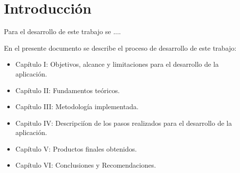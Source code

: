 \chapter*{Introducci\'on}
\label{chap:introduccion}

Para el desarrollo de este trabajo se  ....

En el presente documento se describe el proceso de desarrollo de este trabajo:

\begin{itemize}
\item Cap\'itulo I: Objetivos, alcance y limitaciones para el desarrollo de la aplicaci\'on.
\item Cap\'itulo II: Fundamentos te\'oricos.
\item Cap\'itulo III: Metodolog\'ia implementada.
\item Capitulo IV: Descripci\'ion de los pasos realizados para el desarrollo de la aplicaci\'on.
\item Cap\'itulo V: Productos finales obtenidos.
\item Cap\'itulo VI: Conclusiones y Recomendaciones.
\end{itemize}